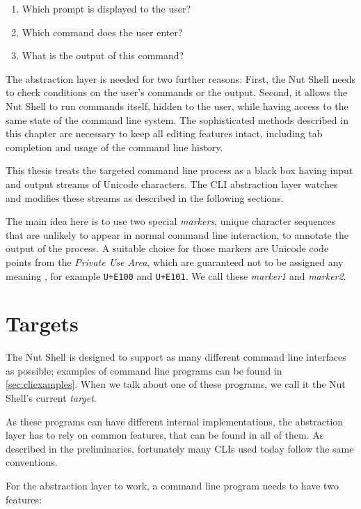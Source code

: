 \documentclass[paper=a4,twoside,abstract=on,cleardoublepage=empty,numbers=noenddot,toc=bib,12pt,appendixprefix=true]{scrreprt}
\begin{document}
\begin{enumerate}
    \item Which prompt is displayed to the user?
    \item Which command does the user enter?
    \item What is the output of this command?
\end{enumerate}

The abstraction layer is needed for two further reasons: First, the Nut Shell needs to check conditions on the user's commands or the output. Second, it allows the Nut Shell to run commands itself, hidden to the user, while having access to the same state of the command line system. The sophisticated methods described in this chapter are necessary to keep all editing features intact, including tab completion and usage of the command line history.

This thesis treats the targeted command line process as a black box having input and output streams of Unicode characters. The \textsc{CLI} abstraction layer watches and modifies these streams as described in the following sections.

The main idea here is to use two special \emph{markers}, unique character sequences that are unlikely to appear in normal command line interaction, to annotate the output of the process. A suitable choice for those markers are Unicode code points from the \emph{Private Use Area}, which are guaranteed not to be assigned any meaning \cite[p. 558]{unicode6.2}, for example \texttt{U+E100} and \texttt{U+E101}. We call these \emph{marker1} and \emph{marker2}.

\section{Targets}
\label{sec:targets}

The Nut Shell is designed to support as many different command line interfaces as possible; examples of command line programs can be found in \cref{sec:cliexamples}. When we talk about one of these programs, we call it the Nut Shell's current \emph{target}.

As these programs can have different internal implementations, the abstraction layer has to rely on common features, that can be found in all of them. As described in the preliminaries, fortunately many \textsc{CLI}s used today follow the same conventions.

For the abstraction layer to work, a command line program needs to have two features:
\end{document}
